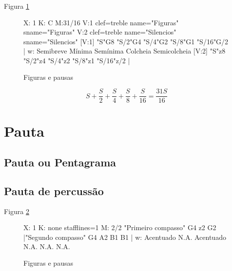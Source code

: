 Figura \ref{fig:figuraspausas}
\begin{figure}[H]
\centering
\begin{abc}[name=figuraspausas]
%
X: 1 %
K: C %
M:31/16
V:1 clef=treble name="Figuras"   sname="Figuras"
V:2 clef=treble name="Silencios" sname="Silencios"
%
[V:1] "S"G8  "S/2"G4  "S/4"G2  "S/8"G1 "S/16"G/2           |
w:    Semibreve Mínima Semínima Colcheia Semicolcheia        
%
[V:2] "S"z8 "S/2"z4 "S/4"z2  "S/8"z1  "S/16"z/2   |
%       
\end{abc}
\caption{Figuras e pausas}
\label{fig:figuraspausas}
\end{figure}

\begin{equation}
S+\frac{S}{2}+\frac{S}{4}+\frac{S}{8}+\frac{S}{16} =\frac{31S}{16}
\end{equation}



\section{Pauta}

\subsection{Pauta ou Pentagrama}
\subsection{Pauta de percussão}


Figura \ref{fig:monolinearperc}
\begin{figure}[H]
\centering
\begin{abc}[name=monolinearperc]
%
X: 1 %
K: none stafflines=1 %
M: 2/2 %
"Primeiro compasso"  G4 z2 G2 |"Segundo compasso" G4 A2 B1 B1  |
w:  Acentuado   N.A. Acentuado N.A. N.A. N.A.
\end{abc}
\caption{Figuras e pausas}
\label{fig:monolinearperc}
\end{figure}





